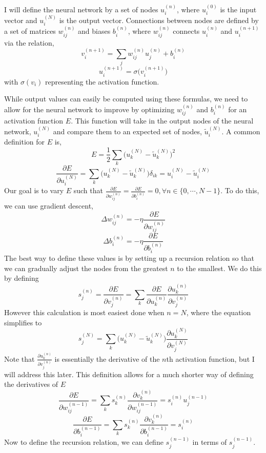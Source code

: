 \documentclass{article}
\begin{document}
I will define the neural network by a set of nodes \(u_i^{(n)}\), where \(u_i^{(0)}\) is the input vector and \(u_i^{(N)}\) is the output vector. Connections between nodes are defined by a set of matrices \(w_{i j}^{(n)}\) and biases \(b_i^{(n)}\), where \(w_{i j}^{(n)}\) connects \(u_i^{(n)}\) and \(u_i^{(n+1)}\) via the relation,
\[v_i^{(n+1)} = \sum_j w_{i j}^{(n)} u_j^{(n)} + b_i^{(n)}\]
\[u_i^{(n+1)} = \sigma \big(v_i^{(n+1)}\big)\]
with \(\sigma (v_i)\) representing the activation function.\par
While output values can easily be computed using these formulas, we need to allow for the neural network to improve by optimizing \(w_{i j}^{(n)}\) and \(b_i^{(n)}\) for an activation function \(E\). This function will take in the output nodes of the neural network, \(u_i^{(N)}\) and compare them to an expected set of nodes, \(\tilde{u}_i^{(N)}\). A common definition for \(E\) is,
\[E = \frac{1}{2} \sum_k \big(u_k^{(N)} - \tilde{u}_k^{(N)}\big)^2\]  
\[\frac{\partial E}{\partial u_i^{(N)}} = \sum_k \big(u_k^{(N)} - \tilde{u}_k^{(N)}\big)\delta_{i k}=u_i^{(N)} - \tilde{u}_i^{(N)}\]
Our goal is to vary \(E\) such that \(\frac{\partial E}{\partial w_{i j}^{(n)}} = \frac{\partial E}{\partial b_{i}^{(n)}}= 0, \forall n \in \{0,\cdots,N-1\}\). To do this, we can use gradient descent,
\[\Delta w_{i j}^{(n)} = - \eta \frac{\partial E}{\partial w_{i j}^{(n)}}\]
\[\Delta b_{i}^{(n)} = - \eta \frac{\partial E}{\partial b_{i}^{(n)}}\]
The best way to define these values is by setting up a recursion relation so that we can gradually adjust the nodes from the greatest \(n\) to the smallest. We do this by defining
\[s_j^{(n)} =\frac{\partial E}{\partial v_{j}^{(n)}} =\sum_k \frac{\partial E}{\partial u_{k}^{(n)}}\frac{\partial u_{k}^{(n)}}{\partial v_{j}^{(n)}}\]
However this calculation is most easiest done when \(n=N\), where the equation simplifies to
\[s_j^{(N)} = \sum_k \big(u_k^{(N)} - \tilde{u}_k^{(N)}\big)\frac{\partial u_{k}^{(N)}}{\partial v_{j}^{(N)}}\]
Note that \(\frac{\partial u_{k}^{(n)}}{\partial v_{j}^{(n)}}\) is essentially the derivative of the \(n\)th activation function, but I will address this later. This definition allows for a much shorter way of defining the derivatives of \(E\)
\[\frac{\partial E}{\partial w_{i j}^{(n-1)}} = \sum_k s_k^{(n)} \frac{\partial v_k^{(n)}}{\partial w_{i j}^{(n-1)}} = s_i^{(n)} u_j^{(n-1)}\] 
\[\frac{\partial E}{\partial b_{i}^{(n-1)}} = \sum_k s_k^{(n)} \frac{\partial v_k^{(n)}}{\partial b_{i}^{(n-1)}} = s_i^{(n)}\] 
Now to define the recursion relation, we can define \(s_j^{(n-1)}\) in terms of \(s_j^{(n-1)}\).
\end{document}
